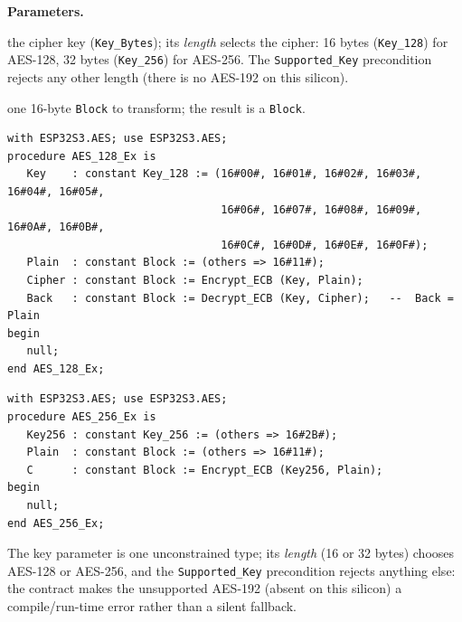 \textbf{Parameters.}
\begin{description}[style=nextline]
\item[\texttt{Key}] the cipher key (\texttt{Key\_Bytes}); its \emph{length} selects
  the cipher: 16 bytes (\texttt{Key\_128}) for AES-128, 32 bytes
  (\texttt{Key\_256}) for AES-256. The \texttt{Supported\_Key} precondition rejects
  any other length (there is no AES-192 on this silicon).
\item[\texttt{Plain} / \texttt{Cipher}] one 16-byte \texttt{Block} to transform; the
  result is a \texttt{Block}.
\end{description}

\begin{lstlisting}
with ESP32S3.AES; use ESP32S3.AES;
procedure AES_128_Ex is
   Key    : constant Key_128 := (16#00#, 16#01#, 16#02#, 16#03#, 16#04#, 16#05#,
                                 16#06#, 16#07#, 16#08#, 16#09#, 16#0A#, 16#0B#,
                                 16#0C#, 16#0D#, 16#0E#, 16#0F#);
   Plain  : constant Block := (others => 16#11#);
   Cipher : constant Block := Encrypt_ECB (Key, Plain);
   Back   : constant Block := Decrypt_ECB (Key, Cipher);   --  Back = Plain
begin
   null;
end AES_128_Ex;
\end{lstlisting}

\begin{lstlisting}
with ESP32S3.AES; use ESP32S3.AES;
procedure AES_256_Ex is
   Key256 : constant Key_256 := (others => 16#2B#);
   Plain  : constant Block := (others => 16#11#);
   C      : constant Block := Encrypt_ECB (Key256, Plain);
begin
   null;
end AES_256_Ex;
\end{lstlisting}

The key parameter is one unconstrained type; its \emph{length} (16 or 32 bytes)
chooses AES-128 or AES-256, and the \texttt{Supported\_Key} precondition rejects
anything else: the contract makes the unsupported AES-192 (absent on this
silicon) a compile/run-time error rather than a silent fallback.
